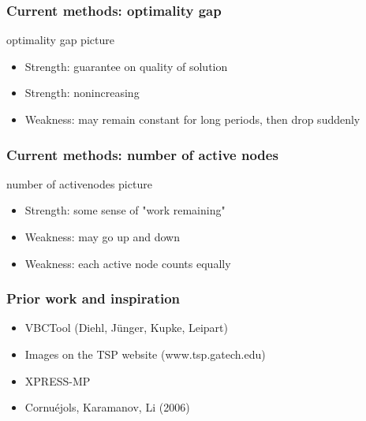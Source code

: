 \documentclass{beamer}
\begin{document}
\begin{frame}
\frametitle{Current methods: optimality gap}

\begin{center}
optimality gap picture
\end{center}

\begin{itemize}[<+->]
\item Strength: guarantee on quality of solution
\item Strength: nonincreasing
\item \alert {Weakness: may remain constant for long periods, then drop suddenly } 
\end{itemize}
\end{frame}

\begin{frame}
\frametitle{Current methods: number of active nodes}

\begin{center}
number of activenodes picture
\end{center}

\begin{itemize}[<+->]
\item Strength: some sense of "work remaining"
\item \alert {Weakness: may go up and down}
\item \alert {Weakness: each active node counts equally } 
\end{itemize}
\end{frame}

\begin{frame}
\frametitle{Prior work and inspiration}

\begin{itemize}[<+->]
\item VBCTool (Diehl, J\"unger, Kupke, Leipart)
\item Images on the TSP website (www.tsp.gatech.edu)
\item XPRESS-MP
\item Cornu\'ejols, Karamanov, Li (2006)
\end{itemize}
\end{frame}
\end{document}
